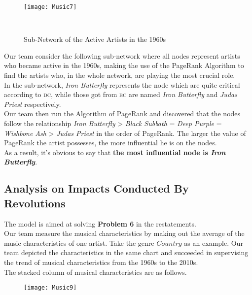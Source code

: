 \documentclass[12pt]{article}
\begin{document}
\begin{wrapfigure}{l}{0cm}
	\centering
	\texttt{[image: Music7]}
	\caption{Sub-Network of the Active Artists in the 1960s}\
\end{wrapfigure}
Our team consider the following sub-network where all nodes represent artists who became active in the 1960s, making the use of the PageRank Algorithm to find the artists who, in the whole network, are playing the most crucial role.\\[2ex]
In the sub-network, {\textit{Iron Butterfly}} represents the node which are quite critical according to {\textsc{dc}}, while those got from {\textsc{bc}} are named {\textit{Iron Butterfly}} and {\textit{Judas Priest}} respectively.\\[2ex]
Our team then run the Algorithm of PageRank and discovered that the nodes follow the relationship {\textit{Iron Butterfly} > \textit{Black Subbath} = \textit{Deep Purple} = \textit{Wishbone Ash} > \textit{Judas Priest}} in the order of PageRank. The larger the value of PageRank the artist possesses, the more influential he is on the nodes.\\[2ex]
As a result, it's obvious to say that {\bfseries{the most influential node is {\textit{Iron Butterfly}}}}.\\
\subsection{Analysis on Impacts Conducted By Revolutions}
The model is aimed at solving {\textbf{Problem 6}} in the restatements.\\[2ex]
Our team measure the musical characteristics by making out the average of the music characteristics of one artist. Take the genre $Country$ as an example. Our team depicted the characteristics in the same chart and succeeded in supervising the trend of musical characteristics from the 1960s to the 2010s.\\[2ex]
The stacked column of musical characteristics are as follows.

\begin{wrapfigure}{l}{0cm}
\centering
	\texttt{[image: Music9]}
\end{wrapfigure}
\end{document}
